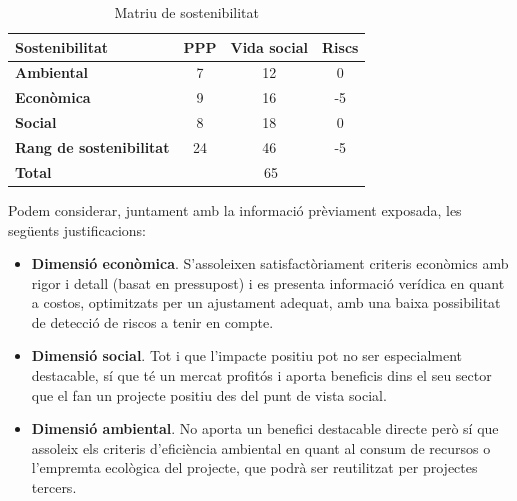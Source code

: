 \begin{table}[htb]
\centering
\label{MatriuSostenibilitat}
\begin{tabular}{lccc}
\hline \textbf{Sostenibilitat}                           &  \textbf{PPP} & \textbf{Vida social}                           &  \textbf{Riscs} \\
\hline
\textbf{Ambiental} & 7 & 12 & 0 \\
\hline            
\textbf{Econòmica} & 9 & 16 & -5 \\
\hline
\textbf{Social} & 8 & 18 & 0 \\
\hline
\textbf{Rang de sostenibilitat} & 24 & 46 & -5 \\
\hline
\textbf{Total} & \multicolumn{3}{c}{65}
\end{tabular}%
\caption{Matriu de sostenibilitat}
\end{table}

Podem considerar, juntament amb la informació prèviament exposada, les següents justificacions:

\begin{itemize}
\item \textbf{Dimensió econòmica}. S’assoleixen satisfactòriament criteris econòmics amb rigor i detall (basat en pressupost) i es presenta informació verídica en quant a costos, optimitzats per un ajustament adequat, amb una baixa possibilitat de detecció de riscos a tenir en compte.
\item \textbf{Dimensió social}. Tot i que l’impacte positiu pot no ser especialment destacable, sí que té un mercat profitós i aporta beneficis dins el seu sector que el fan un projecte positiu des del punt de vista social.
\item \textbf{Dimensió ambiental}. No aporta un benefici destacable directe però sí que assoleix els criteris d’eficiència ambiental en quant al consum de recursos o l’empremta ecològica del projecte, que podrà ser reutilitzat per projectes tercers.
\end{itemize}